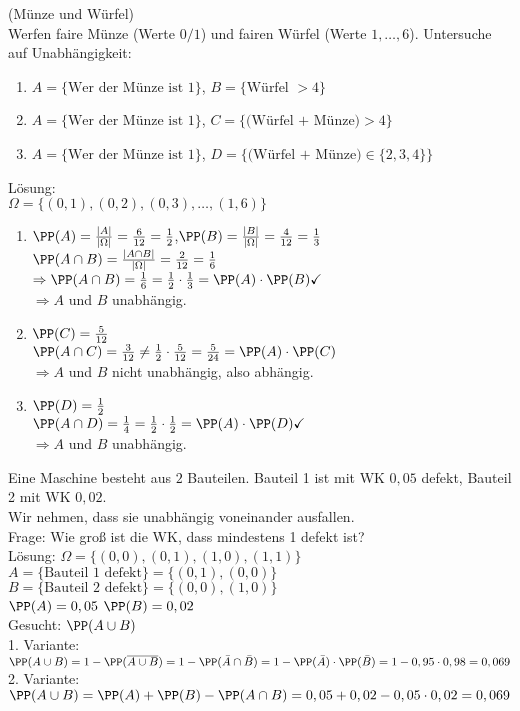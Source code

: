 \documentclass{scrreprt}
\begin{document}
 (Münze und Würfel)\\
Werfen faire Münze (Werte $0/1$) und fairen Würfel (Werte $1,\dots,6$). Untersuche auf Unabhängigkeit:
\begin{enumerate}
\item $A=\{\text{Wer der Münze ist }1\}$, $B=\{\text{Würfel }>4\}$
\item $A=\{\text{Wer der Münze ist }1\}$, $C=\{\text{(Würfel + Münze)} >4 \}$
\item $A=\{\text{Wer der Münze ist }1\}$, $D=\{\text{(Würfel + Münze)}\in\{2,3,4\}\}$
\end{enumerate}
Lösung:\\
$\Omega = \{ (0,1), (0,2), (0,3),\dots , (1,6)\}$
\begin{enumerate}
\item $\PP(A) =\frac{|A|}{|\Omega|}=\frac{6}{12}=\frac{1}{2}$,\quad $\PP(B) = \frac{|B|}{|\Omega|}=\frac{4}{12}=\frac{1}{3}$\\
$\PP(A \cap B)=\frac{|A\cap B|}{|\Omega|}=\frac{2}{12}=\frac{1}{6}$\\
$\Rightarrow \PP(A\cap B) = \frac{1}{6}=\frac{1}{2}\cdot \frac{1}{3}= \PP(A)\cdot \PP(B) \checkmark$\\
$\Rightarrow A$ und $B$ unabhängig.
\item $\PP(C) = \frac{5}{12}$\\
$\PP(A \cap C) = \frac{3}{12} \not = \frac{1}{2}\cdot \frac{5}{12} = \frac{5}{24} = \PP(A) \cdot \PP(C)$\\
$\Rightarrow A$ und $B$ nicht unabhängig, also abhängig.
\item $\PP(D)=\frac{1}{2}$\\
$\PP(A \cap D ) = \frac{1}{4} = \frac{1}{2} \cdot \frac{1}{2} = \PP(A) \cdot \PP(D) \checkmark$\\
$\Rightarrow A$ und $B$ unabhängig.
\end{enumerate}

 Eine Maschine besteht aus $2$ Bauteilen. Bauteil 1 ist mit WK $0,05$ defekt, Bauteil 2 mit WK $0,02$.\\
Wir nehmen, dass sie unabhängig voneinander ausfallen.\\
Frage: Wie groß ist die WK, dass mindestens 1 defekt ist?\\
Lösung: $\Omega = \{(0,0), (0,1), (1,0), (1,1)\}$\\
$A=\{\text{Bauteil 1 defekt}\}=\{(0,1),(0,0)\}$\\
$B=\{\text{Bauteil 2 defekt}\}=\{(0,0), (1,0)\}$\\
$\PP(A) = 0,05$ \quad $\PP(B) = 0,02$\\
Gesucht: $\PP(A \cup B)$\\
1. Variante: $\PP(A \cup B) = 1 - \PP(\overline{A \cup B}) = 1 - \PP(\bar A \cap \bar B) = 1 - \PP(\bar A) \cdot \PP(\bar B) = 1-0,95\cdot 0,98 = 0,069$\\
2. Variante: $\PP(A \cup B) = \PP(A) + \PP(B) - \PP(A \cap B) = 0,05 + 0,02 - 0,05\cdot 0,02 = 0,069$
\end{document}
